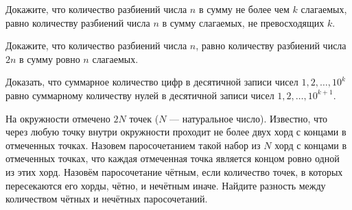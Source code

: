 \begin{problems}
\item \subproblem Докажите, что количество разбиений числа $n$ в сумму не более чем $k$ слагаемых, равно количеству разбиений числа $n$ в сумму слагаемых, не превосходящих $k$.

\subproblem Докажите, что количество разбиений числа $n$, равно количеству разбиений числа $2n$ в сумму ровно $n$ слагаемых.

\item Доказать, что суммарное количество цифр в десятичной записи чисел $1, 2, \ldots, 10^k$ равно суммарному количеству нулей в десятичной записи чисел $1, 2, \dots, 10^{k + 1}$.{\sloppy\par}

\item На окружности отмечено $2N$ точек ($N$ --- натуральное число). Известно, что через любую точку внутри окружности проходит не более двух хорд с концами в отмеченных точках. Назовем паросочетанием такой набор из $N$ хорд с концами в отмеченных точках, что каждая отмеченная точка является концом ровно одной из этих хорд. Назовём паросочетание чётным, если количество точек, в которых пересекаются его хорды, чётно, и нечётным иначе. Найдите разность между количеством чётных и нечётных паросочетаний.

\end{problems}